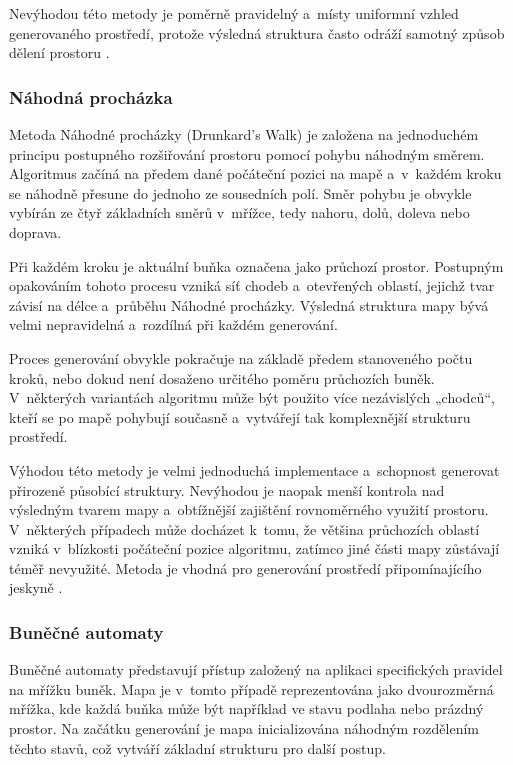 \documentclass[
   program=itk,
   biblatex,
   figures=true,
   tables=true,
   glossaries,
   index
]{kidiplom}
\begin{document}
Nevýhodou této metody je poměrně pravidelný a~místy uniformní vzhled generovaného prostředí, protože výsledná struktura často odráží samotný způsob dělení prostoru \cite{Linden2014,Shaker2016}.

\subsubsection{Náhodná procházka}

Metoda Náhodné procházky (Drunkard's Walk) je založena na jednoduchém principu postupného rozšiřování prostoru pomocí pohybu náhodným směrem. Algoritmus začíná na předem dané počáteční pozici na mapě a~v~každém kroku se náhodně přesune do jednoho ze sousedních polí. Směr pohybu je obvykle vybírán ze čtyř základních směrů v~mřížce, tedy nahoru, dolů, doleva nebo doprava.

Při každém kroku je aktuální buňka označena jako průchozí prostor. Postupným opakováním tohoto procesu vzniká síť chodeb a~otevřených oblastí, jejichž tvar závisí na délce a~průběhu Náhodné procházky. Výsledná struktura mapy bývá velmi nepravidelná a~rozdílná při každém generování.

Proces generování obvykle pokračuje na základě předem stanoveného počtu kroků, nebo dokud není dosaženo určitého poměru průchozích buněk. V~některých variantách algoritmu může být použito více nezávislých „chodců“, kteří se po mapě pohybují současně a~vytvářejí tak komplexnější strukturu prostředí.

Výhodou této metody je velmi jednoduchá implementace a~schopnost generovat přirozeně působící struktury. Nevýhodou je naopak menší kontrola nad výsledným tvarem mapy a~obtížnější zajištění rovnoměrného využití prostoru. V~některých případech může docházet k~tomu, že většina průchozích oblastí vzniká v~blízkosti počáteční pozice algoritmu, zatímco jiné části mapy zůstávají téměř nevyužité. Metoda je vhodná pro generování prostředí připomínajícího jeskyně \cite{Shaker2016}.

\subsubsection{Buněčné automaty}

Buněčné automaty představují přístup založený na aplikaci specifických pravidel na mřížku buněk. Mapa je v~tomto případě reprezentována jako dvourozměrná mřížka, kde každá buňka může být například ve stavu podlaha nebo prázdný prostor. Na začátku generování je mapa inicializována náhodným rozdělením těchto stavů, což vytváří základní strukturu pro další postup.
\end{document}
